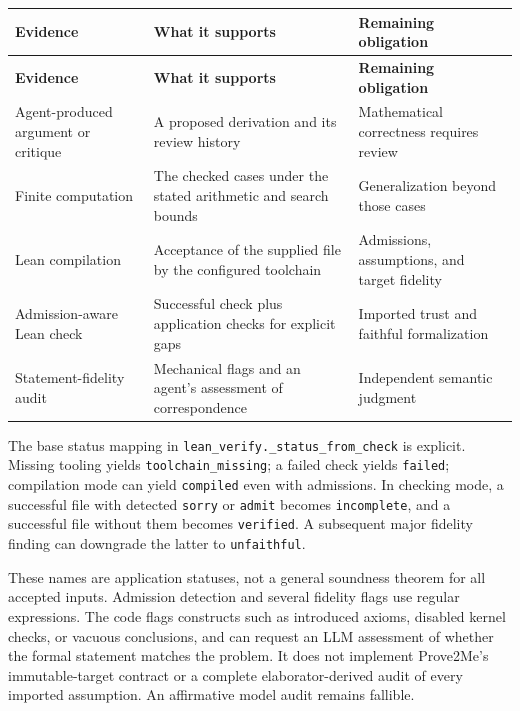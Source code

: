 \documentclass[11pt,a4paper]{article}
\begin{document}
\begingroup\small
\setlength{\tabcolsep}{4pt}
\begin{longtable}{>{\raggedright\arraybackslash}p{0.23\dimexpr\linewidth-6\tabcolsep\relax}>{\raggedright\arraybackslash}p{0.38\dimexpr\linewidth-6\tabcolsep\relax}>{\raggedright\arraybackslash}p{0.39\dimexpr\linewidth-6\tabcolsep\relax}}
\toprule
\textbf{Evidence} & \textbf{What it supports} & \textbf{Remaining obligation} \\
\midrule\endfirsthead
\toprule
\textbf{Evidence} & \textbf{What it supports} & \textbf{Remaining obligation} \\
\midrule\endhead
\bottomrule\endfoot
Agent-produced argument or critique & A proposed derivation and its review history & Mathematical correctness requires review \\
Finite computation & The checked cases under the stated arithmetic and search bounds & Generalization beyond those cases \\
Lean compilation & Acceptance of the supplied file by the configured toolchain & Admissions, assumptions, and target fidelity \\
Admission-aware Lean check & Successful check plus application checks for explicit gaps & Imported trust and faithful formalization \\
Statement-fidelity audit & Mechanical flags and an agent's assessment of correspondence & Independent semantic judgment \\
\end{longtable}
\endgroup

The base status mapping in \nolinkurl{lean_verify._status_from_check} is explicit. Missing tooling yields \nolinkurl{toolchain_missing}; a failed check yields \nolinkurl{failed}; compilation mode can yield \nolinkurl{compiled} even with admissions. In checking mode, a successful file with detected \nolinkurl{sorry} or \nolinkurl{admit} becomes \nolinkurl{incomplete}, and a successful file without them becomes \nolinkurl{verified}. A subsequent major fidelity finding can downgrade the latter to \nolinkurl{unfaithful}.

These names are application statuses, not a general soundness theorem for all accepted inputs. Admission detection and several fidelity flags use regular expressions. The code flags constructs such as introduced axioms, disabled kernel checks, or vacuous conclusions, and can request an LLM assessment of whether the formal statement matches the problem. It does not implement Prove2Me's immutable-target contract or a complete elaborator-derived audit of every imported assumption. An affirmative model audit remains fallible.
\end{document}
